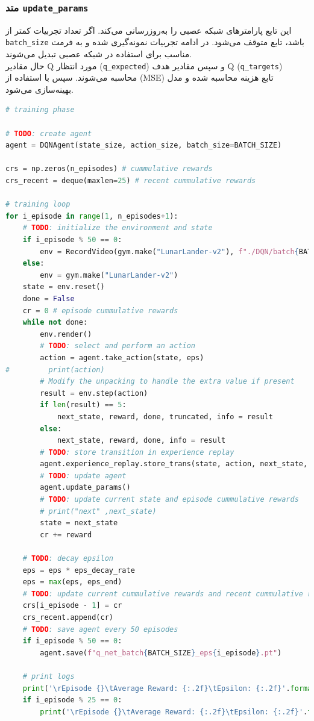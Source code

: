 \documentclass{article}
\begin{document}
\subsubsection{متد \texttt{update\_params}}

این تابع پارامترهای شبکه عصبی را به‌روزرسانی می‌کند. اگر تعداد تجربیات کمتر از \texttt{batch\_size} باشد، تابع متوقف می‌شود. در ادامه تجربیات نمونه‌گیری شده و به فرمت مناسب برای استفاده در شبکه عصبی تبدیل می‌شوند.\\
حال مقادیر Q مورد انتظار (\texttt{q\_expected}) و سپس مقادیر هدف Q (\texttt{q\_targets}) محاسبه می‌شوند. سپس با استفاده از (MSE) تابع هزینه محاسبه شده و مدل بهینه‌سازی می‌شود.




\begin{LTR}
	\begin{lstlisting}[language=Python, caption=Train]
# training phase

# TODO: create agent
agent = DQNAgent(state_size, action_size, batch_size=BATCH_SIZE)

crs = np.zeros(n_episodes) # cummulative rewards
crs_recent = deque(maxlen=25) # recent cummulative rewards

# training loop
for i_episode in range(1, n_episodes+1):
    # TODO: initialize the environment and state
    if i_episode % 50 == 0:
        env = RecordVideo(gym.make("LunarLander-v2"), f"./DQN/batch{BATCH_SIZE}/eps{i_episode}")
    else:
        env = gym.make("LunarLander-v2")
    state = env.reset()
    done = False
    cr = 0 # episode cummulative rewards
    while not done:
        env.render()
        # TODO: select and perform an action
        action = agent.take_action(state, eps)
#         print(action)
        # Modify the unpacking to handle the extra value if present
        result = env.step(action)
        if len(result) == 5:
            next_state, reward, done, truncated, info = result
        else:
            next_state, reward, done, info = result
        # TODO: store transition in experience replay
        agent.experience_replay.store_trans(state, action, next_state, reward, done)
        # TODO: update agent
        agent.update_params()
        # TODO: update current state and episode cummulative rewards
        # print("next" ,next_state)
        state = next_state
        cr += reward

    # TODO: decay epsilon
    eps = eps * eps_decay_rate
    eps = max(eps, eps_end)
    # TODO: update current cummulative rewards and recent cummulative rewards
    crs[i_episode - 1] = cr
    crs_recent.append(cr)
    # TODO: save agent every 50 episodes
    if i_episode % 50 == 0:
        agent.save(f"q_net_batch{BATCH_SIZE}_eps{i_episode}.pt")

    # print logs
    print('\rEpisode {}\tAverage Reward: {:.2f}\tEpsilon: {:.2f}'.format(i_episode, np.mean(crs_recent), eps), end="")
    if i_episode % 25 == 0:
        print('\rEpisode {}\tAverage Reward: {:.2f}\tEpsilon: {:.2f}'.format(i_episode, np.mean(crs_recent), eps))
	\end{lstlisting}
\end{LTR}
\end{document}
